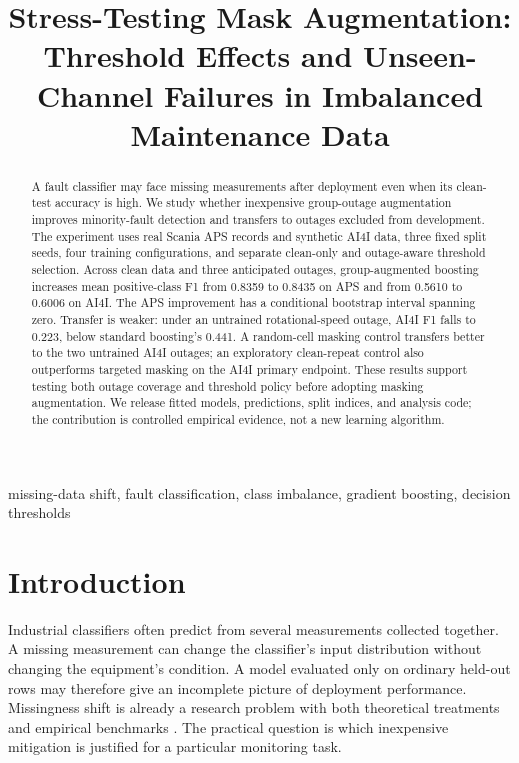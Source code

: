 \documentclass[conference]{IEEEtran}
\begin{document}
\title{Stress-Testing Mask Augmentation: Threshold Effects and Unseen-Channel Failures in Imbalanced Maintenance Data}
\author{}
\maketitle
\begin{abstract}
A fault classifier may face missing measurements after deployment even when its clean-test accuracy is high. We study whether inexpensive group-outage augmentation improves minority-fault detection and transfers to outages excluded from development. The experiment uses real Scania APS records and synthetic AI4I data, three fixed split seeds, four training configurations, and separate clean-only and outage-aware threshold selection. Across clean data and three anticipated outages, group-augmented boosting increases mean positive-class F1 from 0.8359 to 0.8435 on APS and from 0.5610 to 0.6006 on AI4I. The APS improvement has a conditional bootstrap interval spanning zero. Transfer is weaker: under an untrained rotational-speed outage, AI4I F1 falls to 0.223, below standard boosting's 0.441. A random-cell masking control transfers better to the two untrained AI4I outages; an exploratory clean-repeat control also outperforms targeted masking on the AI4I primary endpoint. These results support testing both outage coverage and threshold policy before adopting masking augmentation. We release fitted models, predictions, split indices, and analysis code; the contribution is controlled empirical evidence, not a new learning algorithm.
\end{abstract}
\begin{IEEEkeywords}
missing-data shift, fault classification, class imbalance, gradient boosting, decision thresholds
\end{IEEEkeywords}

\section{Introduction}
Industrial classifiers often predict from several measurements collected together. A missing measurement can change the classifier's input distribution without changing the equipment's condition. A model evaluated only on ordinary held-out rows may therefore give an incomplete picture of deployment performance. Missingness shift is already a research problem with both theoretical treatments and empirical benchmarks \cite{zhou23b,cheng25e}. The practical question is which inexpensive mitigation is justified for a particular monitoring task.
\end{document}
